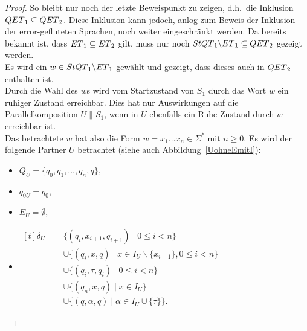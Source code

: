 \begin{proof}
  So bleibt nur noch der letzte Beweispunkt zu zeigen, d.h.\ die Inklusion
  $QET{}_1\subseteq QET{}_2$. Diese Inklusion kann jedoch, anlog zum Beweis
  der Inklusion der error-gefluteten Sprachen, noch weiter eingeschränkt werden.
  Da bereits bekannt ist, dass $ET{}_1\subseteq ET{}_2$ gilt, muss nur
  noch $StQT{}_1\backslash ET{}_1\subseteq QET{}_2$ gezeigt werden.\\
  Es wird ein $w\in StQT{}_1\backslash ET{}_1$ gewählt und gezeigt, dass
  dieses auch in $QET{}_2$ enthalten ist.\\
  Durch die Wahl des $w$s wird vom Startzustand von $S_1$ durch das Wort $w$
  ein ruhiger Zustand erreichbar. Dies hat nur Auswirkungen auf die
  Parallelkomposition $U\|S_1$, wenn in $U$ ebenfalls ein Ruhe-Zustand durch
  $w$ erreichbar ist.\\
  Das betrachtete $w$ hat also die Form $w=x_1\dots x_n\in \Sigma ^*$ mit
  $n\geq 0$. Es wird der folgende Partner $U$ betrachtet (siehe auch
  Abbildung~\ref{UohneEmitI}):
  \begin{itemize}
    \item $Q_U=\{q_0,q_1,\dots ,q_n, q\}$,
    \item $q_{0U}=q_0$,
    \item $E_U=\emptyset$,
    \item $\begin{aligned}[t]
        \delta _U=&\{(q_i,x_{i+1},q_{i+1})\mid  0\leq i< n\}\\
                  &\cup\{(q_i,x,q)\mid  x\in I_U\backslash\{x_{i+1}\}, 0\leq i< n\}\\
                  &\cup\{(q_i,\tau,q_i)\mid 0\leq i< n\}\\
                  &\cup\{(q_n,x,q)\mid x\in I_U\}\\
                  &\cup\{(q,\alpha,q)\mid \alpha\in I_U\cup\{\tau\}\}.
    \end{aligned}$
  \end{itemize}
  \begin{figure} [h!tbp]
  \begin{center}
\end{center}
\end{figure}
\end{proof}
